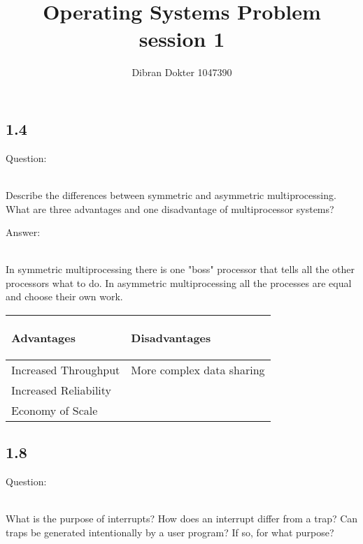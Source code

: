 \documentclass[]{article}
\title{Operating Systems Problem session 1}
\author{Dibran Dokter 1047390}
\begin{document}
\maketitle

\subsection*{1.4}

\begin{bfseries} Question: \end{bfseries}\\
Describe the differences between symmetric and asymmetric multiprocessing.
What are three advantages and one disadvantage of multiprocessor systems?\\

\begin{bfseries} Answer: \end{bfseries}\\
In symmetric multiprocessing there is one "boss" processor that tells all the other processors what to do. In asymmetric multiprocessing all the processes are equal and choose their own work.\\

\begin{tabular}{|l|l|}
	
	\hline
	\begin{bfseries}Advantages\end{bfseries} & \begin{bfseries}Disadvantages\end{bfseries}\\
	\hline	
	Increased Throughput	& More complex data sharing\\
	Increased Reliability	& \\
	Economy of Scale		& \\
	\hline
	
\end{tabular}

\subsection*{1.8}

\begin{bfseries} Question: \end{bfseries}\\
What is the purpose of interrupts? How does an interrupt differ from a trap? Can traps be generated intentionally by a user program? If so, for what purpose?
\end{document}
